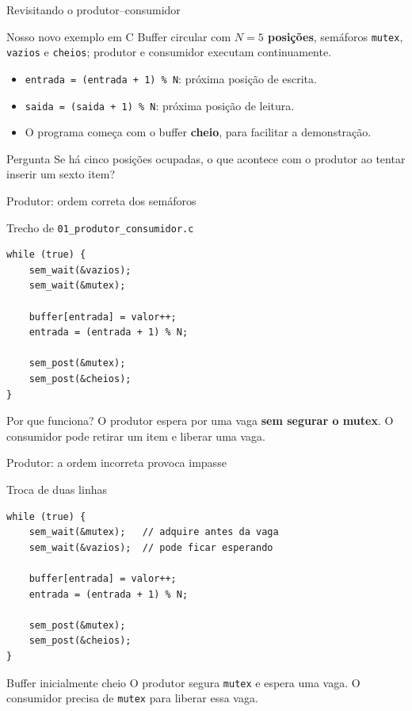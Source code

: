 \documentclass[aspectratio=169,11pt]{beamer}
\begin{document}
\begin{frame}{Revisitando o produtor--consumidor}
\small
\begin{block}{Nosso novo exemplo em C}
Buffer circular com \textbf{$N=5$ posições}, semáforos \texttt{mutex}, \texttt{vazios} e \texttt{cheios}; produtor e consumidor executam continuamente.
\end{block}
\begin{itemize}
\item \texttt{entrada = (entrada + 1) \% N}: próxima posição de escrita.
\item \texttt{saida = (saida + 1) \% N}: próxima posição de leitura.
\item O programa começa com o buffer \textbf{cheio}, para facilitar a demonstração.
\end{itemize}
\begin{alertblock}{Pergunta}
Se há cinco posições ocupadas, o que acontece com o produtor ao tentar inserir um sexto item?
\end{alertblock}
\end{frame}

\begin{frame}[fragile]{Produtor: ordem correta dos semáforos}
\small
\begin{block}{Trecho de \texttt{01\_produtor\_consumidor.c}}
\begin{verbatim}
while (true) {
    sem_wait(&vazios);
    sem_wait(&mutex);

    buffer[entrada] = valor++;
    entrada = (entrada + 1) % N;

    sem_post(&mutex);
    sem_post(&cheios);
}
\end{verbatim}
\end{block}
\begin{exampleblock}{Por que funciona?}
O produtor espera por uma vaga \textbf{sem segurar o mutex}. O consumidor pode retirar um item e liberar uma vaga.
\end{exampleblock}
\end{frame}

\begin{frame}[fragile]{Produtor: a ordem incorreta provoca impasse}
\small
\begin{alertblock}{Troca de duas linhas}
\begin{verbatim}
while (true) {
    sem_wait(&mutex);   // adquire antes da vaga
    sem_wait(&vazios);  // pode ficar esperando

    buffer[entrada] = valor++;
    entrada = (entrada + 1) % N;

    sem_post(&mutex);
    sem_post(&cheios);
}
\end{verbatim}
\end{alertblock}
\begin{block}{Buffer inicialmente cheio}
O produtor segura \texttt{mutex} e espera uma vaga. O consumidor precisa de \texttt{mutex} para liberar essa vaga.
\end{block}
\end{frame}
\end{document}
